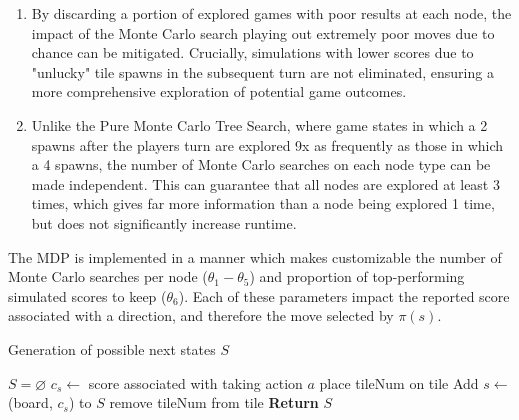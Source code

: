 \documentclass{article}
\begin{document}



\begin{enumerate}
  \item By discarding a portion of explored games with poor results at each node, the impact of the Monte Carlo search playing out extremely poor moves due to chance can be mitigated.  Crucially, simulations with lower scores due to "unlucky" tile spawns in the subsequent turn are not eliminated, ensuring a more comprehensive exploration of potential game outcomes.
  \item Unlike the Pure Monte Carlo Tree Search, where game states in which a 2 spawns after the players turn are explored 9x as frequently as those in which a 4 spawns, the number of Monte Carlo searches on each node type can be made independent.  This can guarantee that all nodes are explored at least 3 times, which gives far more information than a node being explored 1 time, but does not significantly increase runtime.  
 
\end{enumerate}

The MDP is implemented in a manner which makes customizable the number of Monte Carlo searches per node ($\theta_1 - \theta_5$) and proportion of top-performing simulated scores to keep ($\theta_6$).  Each of these parameters impact the reported score associated with a direction, and therefore the move selected by $\pi(s)$.  


\begin{algorithm}
    \caption{Generation of possible next states $S$}
    \label{CREATE_S}
    \begin{algorithmic}[1]
    		\State $S = \varnothing$
                \State $c_s \gets$ score associated with taking action $a$
                		\State place tileNum on tile
                		\State Add $s \gets$ (board, $c_s$) to $S$
                		\State remove tileNum from tile
                	\EndFor
                \EndFor
            \EndFor
		\State \textbf{Return }$S$
        \EndFunction
    \end{algorithmic}
\end{algorithm}
\end{document}
